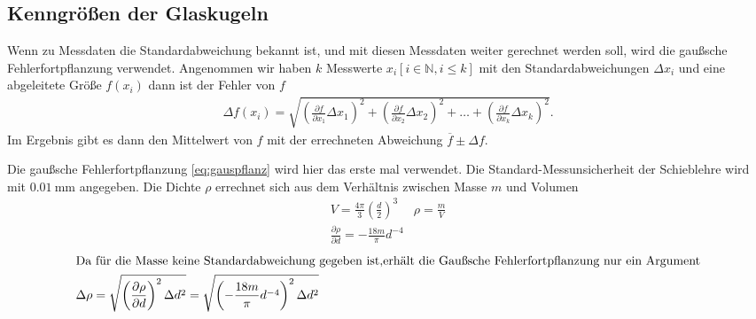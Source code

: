 \subsection{Kenngrößen der Glaskugeln}



Wenn zu Messdaten die Standardabweichung bekannt ist, und mit diesen Messdaten weiter gerechnet werden soll,
wird die gaußsche Fehlerfortpflanzung verwendet. 
Angenommen wir haben $k$ Messwerte $x_i [i \in \mathbb{N}, i \leq k]$ mit den Standardabweichungen $\Delta x_i$
und eine abgeleitete Größe $f(x_i)$ dann ist der Fehler von $f$
\begin{align}
    \Delta f(x_i) = \sqrt{
    \left(\frac{\partial f}{\partial x_1} \Delta x_1\right)^2%
     + \left(\frac{\partial f}{\partial x_2} \Delta x_2\right)^2%
     + \dots%
     + \left(\frac{\partial f}{\partial x_k} \Delta x_k\right)^2%
    }.
    \label{eq:gauspflanz}
\end{align} 
Im Ergebnis gibt es dann den Mittelwert von $f$ mit der errechneten Abweichung $\overline{f} \pm \Delta f $.

Die gaußsche Fehlerfortpflanzung \ref{eq:gauspflanz} wird hier das erste mal verwendet.
Die Standard-Messunsicherheit der Schieblehre wird mit $\qty{0.01}{\mm}$ angegeben.
Die Dichte $\rho$ errechnet sich aus dem Verhältnis zwischen Masse $m$ und Volumen
\begin{align*}
    V = \frac{4 \pi}{3} \left(\frac{d}{2}\right)^3 & \rho = \frac{m}{V} \\
    \frac{\partial \rho}{\partial d} = -\frac{18 m}{\pi} d^{-4} %
\end{align*}
%
\begin{align*}
\intertext{Da für die Masse keine Standardabweichung gegeben ist,%
 erhält die Gaußsche Fehlerfortpflanzung nur ein Argument}%
    \Delta \rho &= \sqrt{\left(\frac{\partial \rho}{\partial d} \right)^{2} \Delta d^{2} }%
    =\sqrt{\left(-\frac{18 m}{\pi} d^{-4} \right)^{2} \Delta d^{2} } \\%
\end{align*}%




